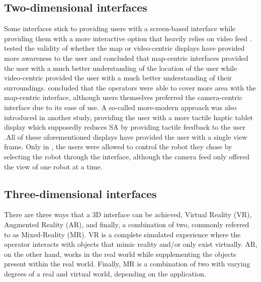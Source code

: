 \documentclass[conference]{IEEEtran}
\begin{document}
\subsection{Two-dimensional interfaces}
Some interfaces stick to providing users with a screen-based interface while providing them with a more interactive option that heavily relies on video feed \cite{b13}. \cite{b14}  tested the validity of whether the map or video-centric displays have provided more awareness to the user and concluded that map-centric interfaces provided the user with a much better understanding of the location of the user while video-centric provided the user with a much better understanding of their surroundings. \cite{b15} concluded that the operators were able to cover more area with the map-centric interface, although users themselves preferred the camera-centric interface due to its ease of use. A so-called more-modern approach was also introduced in another study,  providing the user with a more tactile haptic tablet display which supposedly reduces SA by providing tactile feedback to the user \cite{b16}.All of these aforementioned displays have provided the user with a single view frame. Only in \cite{b13}, the users were allowed to control the robot they chose by selecting the robot through the interface, although the camera feed only offered the view of one robot at a time. 


\subsection{Three-dimensional interfaces}

There are three ways that a 3D interface can be achieved, Virtual Reality (VR), Augmented Reality (AR), and finally, a combination of two, commonly referred to as Mixed-Reality (MR). VR is a complete simulated experience where the operator interacts with objects that mimic reality and/or only exist virtually. AR, on the other hand, works in the real world while supplementing the objects present within the real world. Finally, MR is a combination of two with varying degrees of a real and virtual world, depending on the application. \cite{b20}
\end{document}
